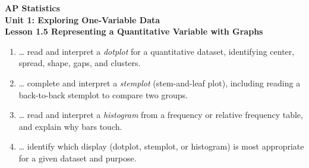 \documentclass[10pt]{article}
\begin{document}
\vspace{-0.8in}

\begin{center}
  {\color{white}\textbf{\LARGE AP Statistics}}\\[4pt]
  {\color{skymid}\large\textbf{Unit 1: Exploring One-Variable Data}}\\[6pt]
  {\color{white}\textbf{\large Lesson 1.5 \quad Representing a Quantitative Variable with Graphs}}
\end{center}

\vspace{0.22in}

\namedateperiod

\vspace{0.18in}

\begin{learningtargetbox}
\small
\begin{enumerate}[leftmargin=1.5em, itemsep=5pt]
  \item \ldots{} read and interpret a \textit{dotplot} for a quantitative dataset,
        identifying center, spread, shape, gaps, and clusters.
  \item \ldots{} complete and interpret a \textit{stemplot} (stem-and-leaf plot),
        including reading a back-to-back stemplot to compare two groups.
  \item \ldots{} read and interpret a \textit{histogram} from a frequency or
        relative frequency table, and explain why bars touch.
  \item \ldots{} identify which display (dotplot, stemplot, or histogram) is most
        appropriate for a given dataset and purpose.
\end{enumerate}
\end{learningtargetbox}

\vspace{0.14in}
\end{document}
